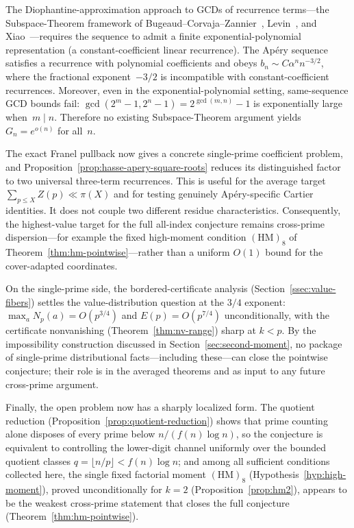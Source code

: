 \documentclass[11pt]{article}
\theoremstyle{definition}
\theoremstyle{remark}
\begin{document}
The Diophantine-approximation approach to GCDs of
recurrence terms---the Subspace-Theorem framework
of Bugeaud--Corvaja--Zannier~\cite{BCZ2003},
Levin~\cite{Levin2019}, and
Xiao~\cite{Xiao2024}---requires the sequence
to admit a finite exponential-polynomial
representation (a constant-coefficient
linear recurrence).
The Ap\'ery sequence satisfies a recurrence
with polynomial coefficients and obeys
$b_n \sim C\alpha^n n^{-3/2}$, where
the fractional exponent~$-3/2$ is
incompatible with constant-coefficient
recurrences.
Moreover, even in the exponential-polynomial
setting, same-sequence GCD bounds fail:
$\gcd(2^m{-}1, 2^n{-}1) = 2^{\gcd(m,n)}{-}1$
is exponentially large when~$m \mid n$.
Therefore no existing Subspace-Theorem
argument yields $G_n = e^{o(n)}$ for all~$n$.

The exact Franel pullback now gives a concrete single-prime
coefficient problem, and
Proposition~\ref{prop:hasse-apery-square-roots} reduces its
distinguished factor to two universal three-term recurrences.
This is useful for the average target
$\sum_{p\le X}Z(p)\ll\pi(X)$ and for testing genuinely
Ap\'ery-specific Cartier identities.  It does not couple two
different residue characteristics.  Consequently, the
highest-value target for the full all-index conjecture remains
cross-prime dispersion---for example the fixed high-moment
condition $(\mathrm{HM})_8$ of
Theorem~\ref{thm:hm-pointwise}---rather than a uniform
$O(1)$ bound for the cover-adapted coordinates.

On the single-prime side, the bordered-certificate
analysis (Section~\ref{ssec:value-fibers}) settles the
value-distribution question at the $3/4$ exponent:
$\max_a N_p(a) = O(p^{3/4})$ and
$E(p) = O(p^{7/4})$ unconditionally, with the
certificate nonvanishing
(Theorem~\ref{thm:nv-range}) sharp at $k < p$.
By the impossibility construction discussed in
Section~\ref{sec:second-moment}, no package of
single-prime distributional facts---including
these---can close the pointwise conjecture; their role
is in the averaged theorems and as input to any future
cross-prime argument.

Finally, the open problem now has a sharply
localized form. The quotient reduction
(Proposition~\ref{prop:quotient-reduction})
shows that prime counting alone disposes of every
prime below $n/(f(n)\log n)$, so the conjecture is
equivalent to controlling the lower-digit channel
uniformly over the bounded quotient classes
$q = \lfloor n/p \rfloor < f(n)\log n$; and among
all sufficient conditions collected here, the
single fixed factorial moment
$(\mathrm{HM})_8$
(Hypothesis~\ref{hyp:high-moment}), proved
unconditionally for $k = 2$
(Proposition~\ref{prop:hm2}), appears to be the
weakest cross-prime statement that closes the
full conjecture
(Theorem~\ref{thm:hm-pointwise}).
\end{document}
